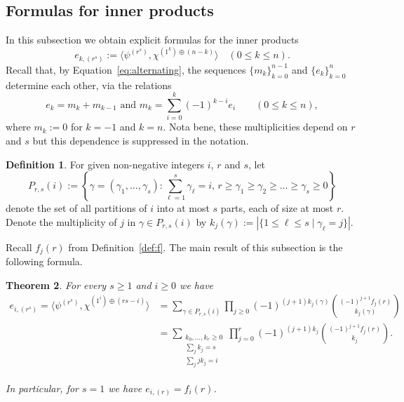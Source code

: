 \documentclass[10pt]{article}
\newtheorem{theorem}{Theorem}[section]
\theoremstyle{definition}
\newtheorem{definition}[theorem]{Definition}
\begin{document}
	
\subsection{Formulas for inner products}\label{sec:e}
	
In this subsection we obtain explicit formulas for the inner products 
\[
    e_{k,(r^s)} := \langle \psi^{(r^s)}, \chi^{(1^k) \oplus (n-k)} \rangle
    \quad (0 \le k \le n).
\]
Recall that, by Equation~\eqref{eq:alternating}, 
the sequences $\{m_k\}_{k=0}^{n-1}$ and $\{e_k\}_{k=0}^{n}$ 
determine each other, via the relations
\[
    e_k = m_k+m_{k-1}
    \text{ and }
    m_k = \sum_{i=0}^k (-1)^{k-i} e_i
    \qquad (0 \le k \le n),
\]
where $m_k := 0$ for $k = -1$ and $k = n$.
Nota bene, these multiplicities depend on $r$ and $s$
but this dependence is suppressed in the notation.

\begin{definition}\label{def:partition}
    For given non-negative integers $i$, $r$ and $s$, let
    \[
        P_{r,s}(i) 
        := \left\{ \gamma=(\gamma_1,\ldots,\gamma_s) :
        \sum_{\ell = 1}^{s} \gamma_\ell = i,\, r \ge \gamma_1 \ge \gamma_2 \ge \ldots \ge \gamma_s \ge 0 \right\}
    \]
    denote the set of all partitions of $i$ into at most $s$ parts, each of size at most $r$. 
    Denote the multiplicity of $j$ in $\gamma \in P_{r,s}(i)$ by 
    $k_j(\gamma) := |\{1 \leq \ell \leq s \mid \gamma_\ell=j\}|$.
\end{definition}
	

\setcounter{theorem}{2}%
Recall $f_j(r)$ from Definition~\ref{def:f}. 
The main result of this subsection is the following formula.

\begin{theorem}\label{prop:e_i_formuli}
    For every $s\geq 1$ and $i\geq 0$ we have
    \begin{align*}
        e_{i,(r^s)}
        = \langle \psi^{(r^s)}, \chi^{(1^i) \oplus (rs-i)} \rangle 
        &= \sum_{\gamma\in P_{r,s}(i)} \prod_{j \ge 0}
        (-1)^{(j+1)k_j(\gamma)} \binom{(-1)^{j+1} f_j(r)}{k_j(\gamma)} \\
        &= \sum_{\substack{k_0, \dots, k_r \ge 0 \\ \sum_j k_j = s \\ \sum_j jk_j = i}} \prod_{j = 0}^{r}
        (-1)^{(j+1)k_j} \binom{(-1)^{j+1} f_j(r)}{k_j}.
    \end{align*}
		
    In particular, for $s=1$ we have $e_{i,(r)} = f_i(r)$.
\end{theorem}
\end{document}
